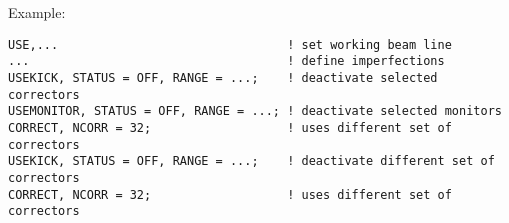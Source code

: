 Example:
\begin{verbatim}
USE,...                                ! set working beam line 
...                                    ! define imperfections 
USEKICK, STATUS = OFF, RANGE = ...;    ! deactivate selected correctors 
USEMONITOR, STATUS = OFF, RANGE = ...; ! deactivate selected monitors   
CORRECT, NCORR = 32;                   ! uses different set of correctors
USEKICK, STATUS = OFF, RANGE = ...;    ! deactivate different set of correctors 
CORRECT, NCORR = 32;                   ! uses different set of correctors
\end{verbatim}

